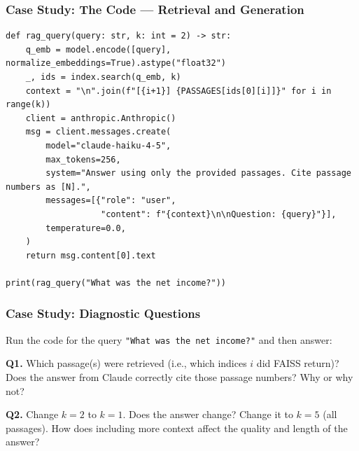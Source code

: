 \documentclass[9pt,t]{beamer}
\begin{document}
\begin{frame}[fragile]
\frametitle{Case Study: The Code --- Retrieval and Generation}

{\footnotesize
\begin{lstlisting}
def rag_query(query: str, k: int = 2) -> str:
    q_emb = model.encode([query], normalize_embeddings=True).astype("float32")
    _, ids = index.search(q_emb, k)
    context = "\n".join(f"[{i+1}] {PASSAGES[ids[0][i]]}" for i in range(k))
    client = anthropic.Anthropic()
    msg = client.messages.create(
        model="claude-haiku-4-5",
        max_tokens=256,
        system="Answer using only the provided passages. Cite passage numbers as [N].",
        messages=[{"role": "user",
                   "content": f"{context}\n\nQuestion: {query}"}],
        temperature=0.0,
    )
    return msg.content[0].text

print(rag_query("What was the net income?"))
\end{lstlisting}
}
\end{frame}

\begin{frame}
\frametitle{Case Study: Diagnostic Questions}

Run the code for the query \texttt{"What was the net income?"} and then answer:

\medskip
\textbf{Q1.} Which passage(s) were retrieved (i.e., which indices $i$ did FAISS return)?
Does the answer from Claude correctly cite those passage numbers? Why or why not?

\medskip
\textbf{Q2.} Change $k = 2$ to $k = 1$. Does the answer change? Change it to $k = 5$
(all passages). How does including more context affect the quality and length of the
answer?
\end{frame}
\end{document}
